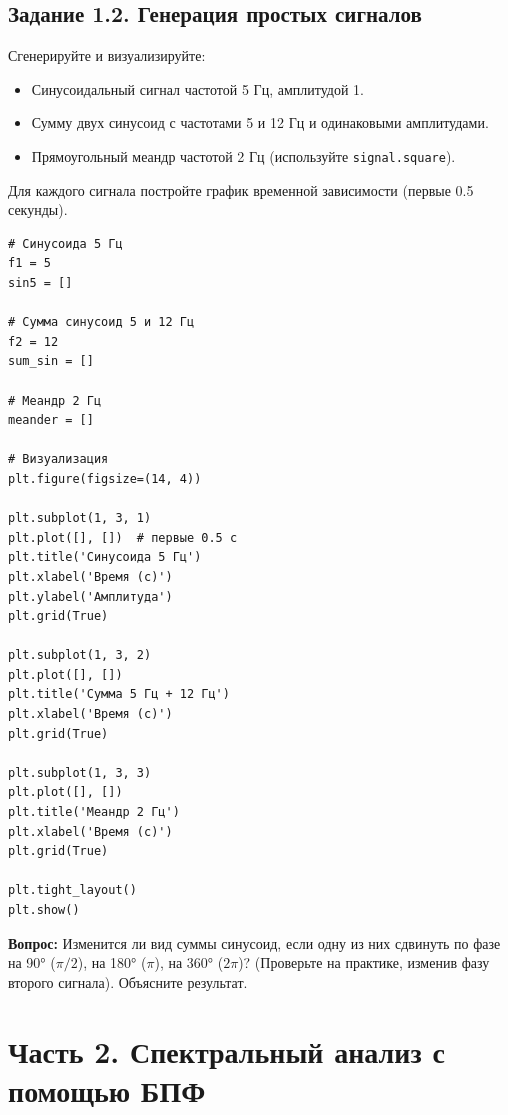 \documentclass[12pt,a4paper,openany]{book}
\providecommand{\tightlist}{\setlength{\itemsep}{0pt}\setlength{\parskip}{0pt}}
\begin{document}
\subsection*{Задание 1.2. Генерация простых сигналов}

Сгенерируйте и визуализируйте:

\begin{itemize}
\tightlist
\item
  Синусоидальный сигнал частотой 5 Гц, амплитудой 1.
\item
  Сумму двух синусоид с частотами 5 и 12 Гц и одинаковыми амплитудами.
\item
  Прямоугольный меандр частотой 2 Гц (используйте \texttt{signal.\allowbreak{}square}).
\end{itemize}

Для каждого сигнала постройте график временной зависимости (первые 0.5 секунды).

\begin{Verbatim}[fontsize=\small, breaklines, breakanywhere, frame=single, framesep=2mm]
# Синусоида 5 Гц
f1 = 5
sin5 = []

# Сумма синусоид 5 и 12 Гц
f2 = 12
sum_sin = []

# Меандр 2 Гц
meander = []

# Визуализация
plt.figure(figsize=(14, 4))

plt.subplot(1, 3, 1)
plt.plot([], [])  # первые 0.5 с
plt.title('Синусоида 5 Гц')
plt.xlabel('Время (с)')
plt.ylabel('Амплитуда')
plt.grid(True)

plt.subplot(1, 3, 2)
plt.plot([], [])
plt.title('Сумма 5 Гц + 12 Гц')
plt.xlabel('Время (с)')
plt.grid(True)

plt.subplot(1, 3, 3)
plt.plot([], [])
plt.title('Меандр 2 Гц')
plt.xlabel('Время (с)')
plt.grid(True)

plt.tight_layout()
plt.show()
\end{Verbatim}

\textbf{Вопрос:} Изменится ли вид суммы синусоид, если одну из них сдвинуть по фазе на 90° (\(\pi/2\)), на 180° (\(\pi\)), на 360° (\(2\pi\))? (Проверьте на практике, изменив фазу второго сигнала). Объясните результат.

\section*{Часть 2. Спектральный анализ с помощью БПФ}
\end{document}
